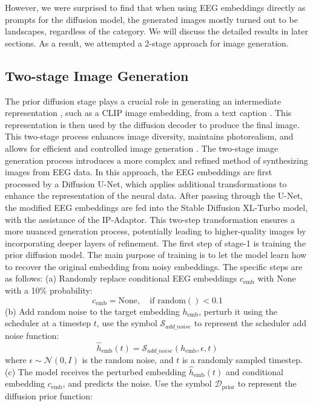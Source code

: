 \documentclass{article}
\begin{document}
However, we were surprised to find that when using EEG embeddings directly as prompts for the diffusion model, the generated images mostly turned out to be landscapes, regardless of the category. We will discuss the detailed results in later sections. As a result, we attempted a 2-stage approach for image generation.


\subsection{Two-stage Image Generation}
The prior diffusion stage plays a crucial role in generating an intermediate representation \cite{632983}, such as a CLIP image embedding, from a text caption \cite{dalle_2022}. This representation is then used by the diffusion decoder to produce the final image. This two-stage process enhances image diversity, maintains photorealism, and allows for efficient and controlled image generation \cite{fmri_to_img_2023}. The two-stage image generation process introduces a more complex and refined method of synthesizing images from EEG data. In this approach, the EEG embeddings are first processed by a Diffusion U-Net, which applies additional transformations to enhance the representation of the neural data. After passing through the U-Net, the modified EEG embeddings are fed into the Stable Diffusion XL-Turbo model, with the assistance of the IP-Adaptor. This two-step transformation ensures a more nuanced generation process, potentially leading to higher-quality images by incorporating deeper layers of refinement. 
The first step of stage-1 is training the prior diffusion model. The main purpose of training is to let the model learn how to recover the original embedding from noisy embeddings. The specific steps are as follows: (a) Randomly replace conditional EEG embeddings $c_{\text{emb}}$ with None with a 10\% probability:
\begin{equation}
c_{\text{emb}} = \text{None}, \quad \text{if } \text{random}() < 0.1
\end{equation}
(b) Add random noise to the target embedding $h_{\text{emb}}$, perturb it using the scheduler at a timestep $t$, use the symbol $\mathcal{S}_{add\_noise}$ to represent the scheduler add noise function:
\begin{equation}
\hat{h}_{\text{emb}}(t) = \mathcal{S}_{add\_noise}(h_{\text{emb}}, \epsilon, t)
\end{equation}
where $\epsilon \sim \mathcal{N}(0, I)$ is the random noise, and $t$ is a randomly sampled timestep.
(c) The model receives the perturbed embedding $\hat{h}_{\text{emb}}(t)$ and conditional embedding $c_{\text{emb}}$, and predicts the noise. Use the symbol $\mathcal{D}_{\text{prior}}$ to represent the diffusion prior function:
\end{document}
